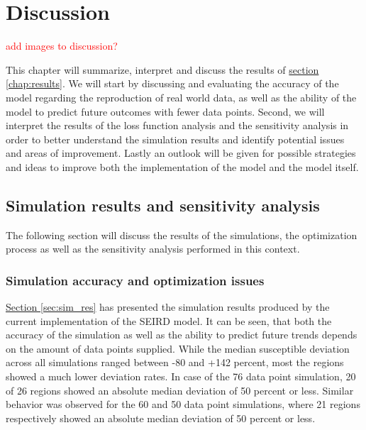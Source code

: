 
\chapter{Discussion} %
\label{chap:discussion} %
\textcolor{red}{add images to discussion?}

This chapter will summarize, interpret and discuss the results of \hyperref[chap:results]{section
\ref*{chap:results}}. We will start by discussing and evaluating the accuracy of the model regarding the reproduction
of real world data, as well as the ability of the model to predict future outcomes with fewer data points. Second, we will
interpret the results of the loss function analysis and the sensitivity analysis in order to better understand the simulation
results and identify potential issues and areas of improvement. Lastly an outlook will be given for possible strategies and
ideas to improve both the implementation of the model and the model itself.

\section{Simulation results and sensitivity analysis}
The following section will discuss the results of the simulations, the optimization process as well as the sensitivity
analysis performed in this context.


\subsection{Simulation accuracy and optimization issues}
\hyperref[sec:sim_res]{Section \ref*{sec:sim_res}} has presented the simulation results produced by the current implementation
of the SEIRD model. It can be seen, that both the accuracy of the simulation as well as the ability to predict future trends
depends on the amount of data points supplied. While the median susceptible deviation across all simulations ranged between
-80 and +142 percent, most the regions showed a much lower deviation rates. In case of the 76 data point simulation, 20 of 26 regions showed an
absolute median deviation of 50 percent or less. Similar behavior was observed for the 60 and 50 data point simulations, where
21 regions respectively showed an absolute median deviation of 50 percent or less. \newline

